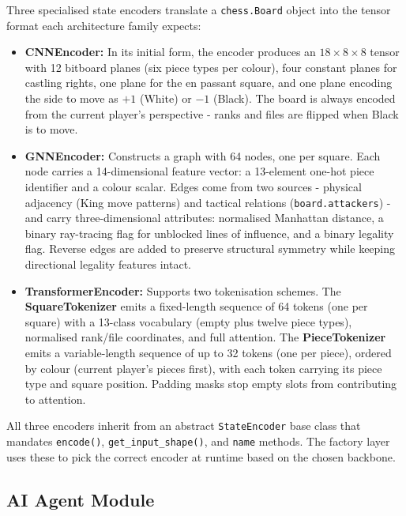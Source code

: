 Three specialised state encoders translate a \texttt{chess.Board} object into the tensor format each architecture family expects:

\begin{itemize}
    \item \textbf{CNNEncoder:} In its initial form, the encoder produces an $18 \times 8 \times 8$ tensor with 12 bitboard planes (six piece types per colour), four constant planes for castling rights, one plane for the en passant square, and one plane encoding the side to move as $+1$ (White) or $-1$ (Black). The board is always encoded from the current player's perspective - ranks and files are flipped when Black is to move.
    \item \textbf{GNNEncoder:} Constructs a graph with 64 nodes, one per square. Each node carries a 14-dimensional feature vector: a 13-element one-hot piece identifier and a colour scalar. Edges come from two sources - physical adjacency (King move patterns) and tactical relations (\texttt{board.attackers}) - and carry three-dimensional attributes: normalised Manhattan distance, a binary ray-tracing flag for unblocked lines of influence, and a binary legality flag. Reverse edges are added to preserve structural symmetry while keeping directional legality features intact.
    \item \textbf{TransformerEncoder:} Supports two tokenisation schemes. The \textbf{SquareTokenizer} emits a fixed-length sequence of 64 tokens (one per square) with a 13-class vocabulary (empty plus twelve piece types), normalised rank/file coordinates, and full attention. The \textbf{PieceTokenizer} emits a variable-length sequence of up to 32 tokens (one per piece), ordered by colour (current player's pieces first), with each token carrying its piece type and square position. Padding masks stop empty slots from contributing to attention.

\end{itemize}

All three encoders inherit from an abstract \texttt{StateEncoder} base class that mandates \texttt{encode()}, \texttt{get\_input\_shape()}, and \texttt{name} methods. The factory layer uses these to pick the correct encoder at runtime based on the chosen backbone.


\subsection{AI Agent Module}


